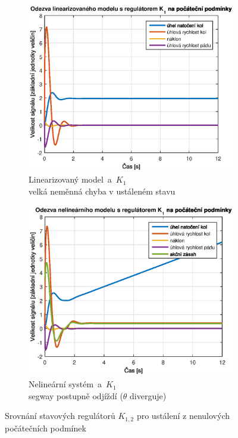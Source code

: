 \documentclass[conference]{IEEEtran}
\begin{document}
\begin{figure}[h!]
    
    \medskip
    
    \centering %
    \begin{subfigure}{0.45\textwidth} 
        \centerline{\includegraphics[width=\linewidth]{stavova_K1_lin.eps}}
        \caption{Linearizovaný model~a~$K_1$ \\ velká neměnná chyba v ustáleném stavu}
        \label{fig:stavova_K1_lin}        
    \end{subfigure}\hfil
    \centering %
\begin{subfigure}{0.45\textwidth}
    \centerline{\includegraphics[width=\linewidth]{stavova_K1_nelin.eps}}
    \caption{Nelineární systém~a~$K_1$ \\ segway postupně odjíždí ($\theta$ diverguje)}
    \label{fig:stavova_K1_nelin}        
\end{subfigure}\hfil

\caption{Srovnání stavových regulátorů $K_{1,2}$ pro ustálení z nenulových počátečních podmínek}
\label{fig:charakteristiky}
\end{figure}
\end{document}
